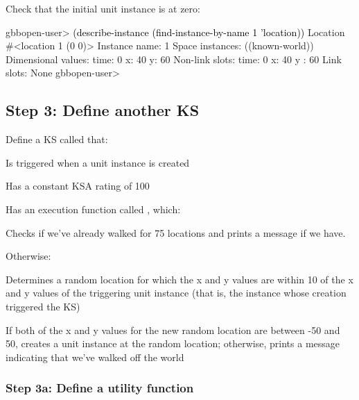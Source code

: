 \documentclass[10pt,twoside,english,pdftex]{article}
\begin{document}
%
%
Check that the initial  unit instance is at  zero:
%
\W\supp
\begin{example}
\textcolor{darkergray}{%
  gbbopen-user> \textcolor{black}{(describe-instance (find-instance-by-name 1 'location))}
  Location #<location 1 (0 0)>
    Instance name: 1
    Space instances: ((known-world))
    Dimensional values:
      time:  0
      x:  40
      y:  60
    Non-link slots:
      time:  0
      x:  40
      y : 60
    Link slots: None
  gbbopen-user>}
\end{example}

\subsection*{Step 3: Define another KS}

Define a KS called  that:
%
\begin{tightitemize}
\item Is triggered when a  unit instance is created
\item Has a constant KSA rating of 100
\item Has an execution function called , which:
\begin{tightitemize}
\item Checks if we've already walked for 75 locations and prints a message if
  we have. 
\item Otherwise:
\begin{tightitemize}
\item Determines a random location for which the x and y values are within 10
  of the x and y values of the triggering unit instance (that is, the
   instance whose creation triggered the 
  KS)
\item If both of the x and y values for the new random location are between
  -50 and 50, creates a  unit instance at the random location;
  otherwise, prints a message indicating that we've walked off the world
\end{tightitemize}
\end{tightitemize}
\end{tightitemize}

\subsubsection*{Step 3a: Define a utility function}
\end{document}
